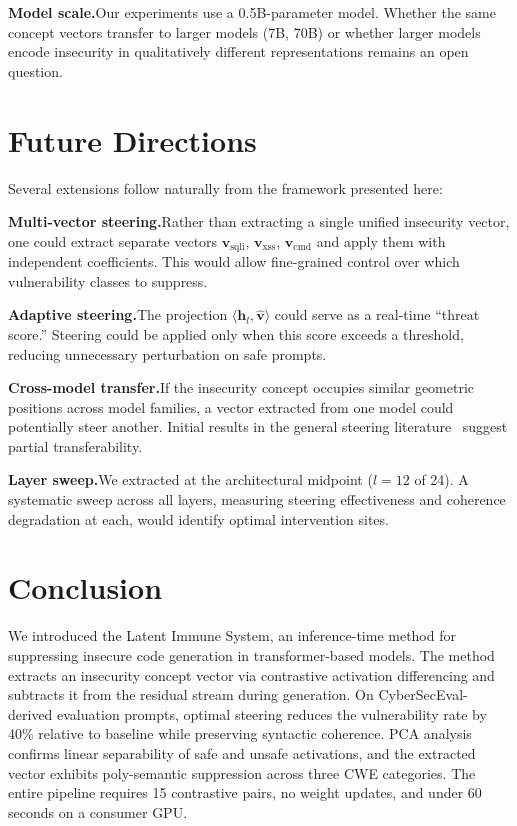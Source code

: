 \documentclass[journal, onecolumn]{IEEEtran}
\begin{document}
\textbf{Model scale.}\quad Our experiments use a 0.5B-parameter model. Whether the same concept vectors transfer to larger models (7B, 70B) or whether larger models encode insecurity in qualitatively different representations remains an open question.

\section{Future Directions}

Several extensions follow naturally from the framework presented here:

\textbf{Multi-vector steering.}\quad Rather than extracting a single unified insecurity vector, one could extract separate vectors $\bm{v}_{\text{sqli}}$, $\bm{v}_{\text{xss}}$, $\bm{v}_{\text{cmd}}$ and apply them with independent coefficients. This would allow fine-grained control over which vulnerability classes to suppress.

\textbf{Adaptive steering.}\quad The projection $\langle \bm{h}_l, \hat{\bm{v}} \rangle$ could serve as a real-time ``threat score.'' Steering could be applied only when this score exceeds a threshold, reducing unnecessary perturbation on safe prompts.

\textbf{Cross-model transfer.}\quad If the insecurity concept occupies similar geometric positions across model families, a vector extracted from one model could potentially steer another. Initial results in the general steering literature~\cite{turner2023} suggest partial transferability.

\textbf{Layer sweep.}\quad We extracted at the architectural midpoint ($l = 12$ of 24). A systematic sweep across all layers, measuring steering effectiveness and coherence degradation at each, would identify optimal intervention sites.

\section{Conclusion}

We introduced the Latent Immune System, an inference-time method for suppressing insecure code generation in transformer-based models. The method extracts an insecurity concept vector via contrastive activation differencing and subtracts it from the residual stream during generation. On CyberSecEval-derived evaluation prompts, optimal steering reduces the vulnerability rate by 40\% relative to baseline while preserving syntactic coherence. PCA analysis confirms linear separability of safe and unsafe activations, and the extracted vector exhibits poly-semantic suppression across three CWE categories. The entire pipeline requires 15 contrastive pairs, no weight updates, and under 60 seconds on a consumer GPU.
\end{document}
